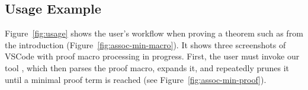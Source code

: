 \begin{figure*}
  
  \caption{Usage example of the proof macros tool.}
  \label{fig:usage}
\end{figure*}

\subsection{Usage Example}
\label{sec:example}

Figure~\ref{fig:usage} shows the user's workflow when proving a
theorem such as  from the introduction
(Figure~\ref{fig:assoc-min-macro}). It shows three screenshots of
VSCode with proof macro processing in progress. First, the user must
invoke our tool , which then parses the proof macro,
expands it, and repeatedly prunes it until a minimal proof term is
reached (see Figure~\ref{fig:assoc-min-proof}).

